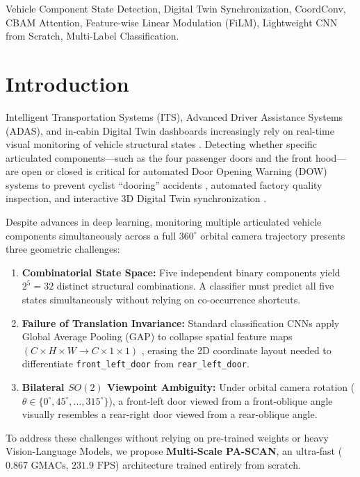 \documentclass[journal]{IEEEtran}
\begin{document}
\begin{IEEEkeywords}
Vehicle Component State Detection, Digital Twin Synchronization, CoordConv, CBAM Attention, Feature-wise Linear Modulation (FiLM), Lightweight CNN from Scratch, Multi-Label Classification.
\end{IEEEkeywords}

\section{Introduction}
 Intelligent Transportation Systems (ITS), Advanced Driver Assistance Systems (ADAS), and in-cabin Digital Twin dashboards increasingly rely on real-time visual monitoring of vehicle structural states \cite{lee2019door,zhu2021fine,wang2022mobility}. Detecting whether specific articulated components---such as the four passenger doors and the front hood---are open or closed is critical for automated Door Opening Warning (DOW) systems to prevent cyclist ``dooring'' accidents \cite{simon2020surrounding}, automated factory quality inspection, and interactive 3D Digital Twin synchronization \cite{liu2024articulated}.

Despite advances in deep learning, monitoring multiple articulated vehicle components simultaneously across a full $360^\circ$ orbital camera trajectory presents three geometric challenges:
\begin{enumerate}
    \item \textbf{Combinatorial State Space:} Five independent binary components yield $2^5 = 32$ distinct structural combinations. A classifier must predict all five states simultaneously without relying on co-occurrence shortcuts.
    \item \textbf{Failure of Translation Invariance:} Standard classification CNNs apply Global Average Pooling (GAP) to collapse spatial feature maps $(C \times H \times W \to C \times 1 \times 1)$ \cite{liu2018coordconv}, erasing the 2D coordinate layout needed to differentiate \texttt{front\_left\_door} from \texttt{rear\_left\_door}.
    \item \textbf{Bilateral $SO(2)$ Viewpoint Ambiguity:} Under orbital camera rotation ($\theta \in \{0^\circ, 45^\circ, \dots, 315^\circ\}$), a front-left door viewed from a front-oblique angle visually resembles a rear-right door viewed from a rear-oblique angle.
\end{enumerate}

To address these challenges without relying on pre-trained weights or heavy Vision-Language Models, we propose \textbf{Multi-Scale PA-SCAN}, an ultra-fast ($0.867\text{ GMACs}$, $231.9\text{ FPS}$) architecture trained entirely from scratch.
\end{document}
